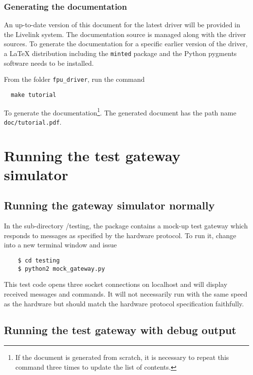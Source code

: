 \documentclass{scrartcl}[12pt,a4paper]
\begin{document}
\subsubsection{Generating the documentation}

An up-to-date version of this document for the latest driver will be
provided in the Livelink system. The documentation source is managed
along with the driver sources.  To generate the documentation for a
specific earlier version of the driver, a \LaTeX{} distribution
including the \texttt{minted} package and the Python pygments software
needs to be installed.

From the folder \texttt{fpu\_driver}, run the
command

\begin{verbatim}
  make tutorial
\end{verbatim}

To generate the documentation\footnote{If the document is generated
  from scratch, it is necessary to repeat this command three times to
  update the list of contents.}. The generated document has the path
name \texttt{doc/tutorial.pdf}.


\section{Running the test gateway simulator} 

\subsection{Running the gateway simulator normally}
In the sub-directory /testing, the package contains a mock-up test
gateway which responds to messages as specified by the hardware
protocol. To run it, change into a new terminal window and
issue

  \begin{verbatim}
    $ cd testing
    $ python2 mock_gateway.py
  \end{verbatim}    


This test code opens three socket connections on localhost and will
display received messages and commands. It will not necessarily run
with the same speed as the hardware but should match the hardware
protocol specification faithfully.

\subsection{Running the test gateway with debug output}
\end{document}
